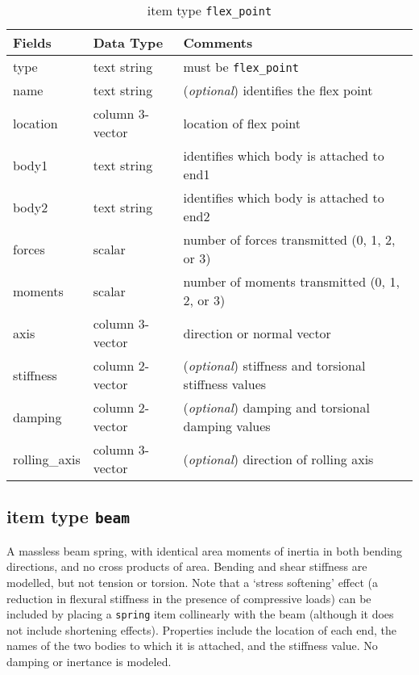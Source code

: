 \begin{table}[!h]
\caption{item type \texttt{flex\_point}}
\label{flexpoint}
\begin{center}
\begin{tabular}{lll}
\toprule
Fields & Data Type & Comments\\
\midrule
type & text string & must be \texttt{flex\_point}\\
name & text string & (\emph{optional}) identifies the flex point\\
location & column 3-vector & location of flex point\\
body1 & text string & identifies which body is attached to end1\\
body2 & text string & identifies which body is attached to end2\\
forces & scalar & number of forces transmitted (0, 1, 2, or 3)\\
moments & scalar & number of moments transmitted (0, 1, 2, or 3)\\
axis & column 3-vector & direction or normal vector\\
stiffness & column 2-vector & (\emph{optional}) stiffness and torsional stiffness values\\
damping & column 2-vector & (\emph{optional}) damping and torsional damping values\\
rolling\_axis & column 3-vector & (\emph{optional}) direction of rolling axis\\
\bottomrule
\end{tabular}
\end{center}
\end{table}
\clearpage

\subsection{item type \texttt{beam}}
A massless beam spring, with identical area moments of inertia in both bending directions, and no cross products of area.  Bending and shear stiffness are modelled, but not tension or torsion.  Note that a `stress softening' effect (a reduction in flexural stiffness in the presence of compressive loads) can be included by placing a \texttt{spring} item collinearly with the beam (although it does not include shortening effects).  Properties include the location of each end, the names of the two bodies to which it is attached, and the stiffness value.  No damping or inertance is modeled.

